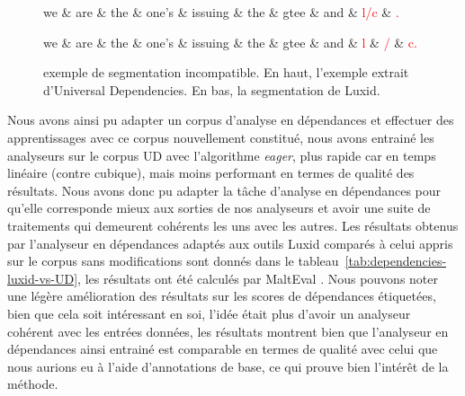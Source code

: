 \documentclass[PhD-Yoann-Dupont.tex]{subfiles}
\begin{document}
\begin{figure}[ht!]
\centering
\begin{dependency}[theme = simple]
   \begin{deptext}[column sep=1.75em]
      we \& are \& the \& one's \& issuing \& the \& gtee \& and \& \textcolor{red}{l/c} \& \textcolor{red}{.} \\
   \end{deptext}
\end{dependency}
\begin{dependency}[theme = simple]
   \begin{deptext}[column sep=1.75em]
      we \& are \& the \& one's \& issuing \& the \& gtee \& and \& \textcolor{red}{l} \& \textcolor{red}{/} \& \textcolor{red}{c.} \\
   \end{deptext}
\end{dependency}
\caption{exemple de segmentation incompatible. En haut, l'exemple extrait d'Universal Dependencies. En bas, la segmentation de Luxid.}
\label{fig:dependency-example2}
\end{figure}

Nous avons ainsi pu adapter un corpus d'analyse en dépendances et effectuer des apprentissages avec ce corpus nouvellement constitué, nous avons entrainé les analyseurs sur le corpus UD avec l'algorithme \emph{eager}, plus rapide car en temps linéaire (contre cubique), mais moins performant en termes de qualité des résultats. Nous avons donc pu adapter la tâche d'analyse en dépendances pour qu'elle corresponde mieux aux sorties de nos analyseurs et avoir une suite de traitements qui demeurent cohérents les uns avec les autres. Les résultats obtenus par l'analyseur en dépendances adaptés aux outils Luxid comparés à celui appris sur le corpus sans modifications sont donnés dans le tableau\ \ref{tab:dependencies-luxid-vs-UD}, les résultats ont été calculés par MaltEval \citep{nilsson2008malteval}. Nous pouvons noter une légère amélioration des résultats sur les scores de dépendances étiquetées, bien que cela soit intéressant en soi, l'idée était plus d'avoir un analyseur cohérent avec les entrées données, les résultats montrent bien que l'analyseur en dépendances ainsi entrainé est comparable en termes de qualité avec celui que nous aurions eu à l'aide d'annotations de base, ce qui prouve bien l'intérêt de la méthode.
\end{document}
